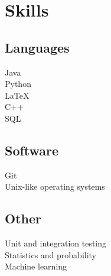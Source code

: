 \documentclass[]{deedy-resume-openfont}
\begin{document}
\begin{minipage}[t]{0.33\textwidth}

\section{Skills}

\subsection{Languages}
\textbullet{} Java \\
\textbullet{} Python \\
\textbullet{} \LaTeX\ \\ 
\textbullet{} C++ \\
\textbullet{} SQL

\subsection{Software}
\textbullet{} Git \\
\textbullet{} Unix-like operating systems

\subsection{Other}
\textbullet{} Unit and integration testing \\
\textbullet{} Statistics and probability \\
\textbullet{} Machine learning

%
%

\end{minipage} 
\hfill
\end{document}

